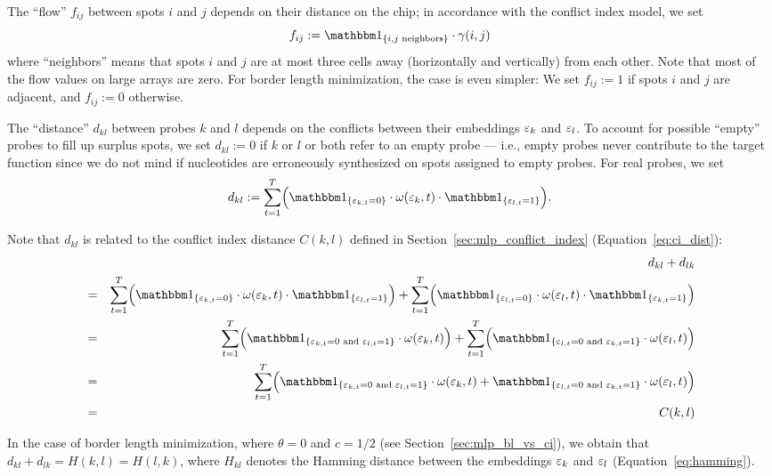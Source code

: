 The ``flow'' $f_{ij}$ between spots $i$ and $j$ depends on their distance on the
chip; in accordance with the conflict index model, we set
\begin{equation}
  f_{ij} := \Ind{i,j \text{ neighbors}} \cdot \gamma(i,j)
\end{equation}
where ``neighbors'' means that spots $i$ and $j$ are at most three cells away
(horizontally and vertically) from each other. Note that most of the flow values
on large arrays are zero. For border length minimization, the case is even
simpler: We set $f_{ij}:=1$ if spots $i$ and $j$ are adjacent, and $f_{ij}:=0$
otherwise.

The ``distance'' $d_{kl}$ between probes $k$ and $l$ depends on the conflicts
between their embeddings $\varepsilon_k$ and $\varepsilon_l$. To account for possible
``empty'' probes to fill up surplus spots, we set $d_{kl}:=0$ if $k$ or $l$ or
both refer to an empty probe --- i.e., empty probes never contribute to the
target function since we do not mind if nucleotides are erroneously synthesized
on spots assigned to empty probes. For real probes, we set
\begin{equation}
  d_{kl} := \sum_{t=1}^{T} \Bigl(
    \Ind{\eps_{k,t}=0}
    \cdot \omega(\eps_k,t)
    \cdot \Ind{\eps_{l,t}=1} \Bigr).
\end{equation}

Note that $d_{kl}$ is related to the conflict index distance $C(k,l)$ defined in
Section~\ref{sec:mlp_conflict_index} (Equation~\ref{eq:ci_dist}):
\begin{eqnarray*}
 &   & d_{kl} + d_{lk} \\
 & = & \sum_{t=1}^{T} \Bigl( \Ind{\eps_{k,t}=0} \cdot \omega(\eps_k,t) \cdot \Ind{\eps_{l,t}=1} \Bigr)
     + \sum_{t=1}^{T} \Bigl( \Ind{\eps_{l,t}=0} \cdot \omega(\eps_l,t) \cdot \Ind{\eps_{k,t}=1} \Bigr) \\
 & = & \sum_{t=1}^{T} \Bigl( \Ind{\eps_{k,t}=0 \text{ and } \eps_{l,t}=1} \cdot \omega(\eps_k,t) \Bigr)
     + \sum_{t=1}^{T} \Bigl( \Ind{\eps_{l,t}=0 \text{ and } \eps_{k,t}=1} \cdot \omega(\eps_l,t) \Bigr) \\
 & = & \sum_{t=1}^{T} \Bigl(
                        \Ind{\eps_{k,t}=0 \text{ and } \eps_{l,t}=1} \cdot \omega(\eps_k,t) +
                        \Ind{\eps_{l,t}=0 \text{ and } \eps_{k,t}=1} \cdot \omega(\eps_l,t)
                      \Bigr) \\
 & = & C(k,l)
\end{eqnarray*}

In the case of border length minimization, where $\theta=0$ and $c=1/2$ (see
Section~\ref{sec:mlp_bl_vs_ci}), we obtain that
$d_{kl} + d_{lk} = H(k,l) = H(l,k)$, where $H_{kl}$ denotes the Hamming distance
between the embeddings $\varepsilon_k$ and $\varepsilon_l$ (Equation~\ref{eq:hamming}).

